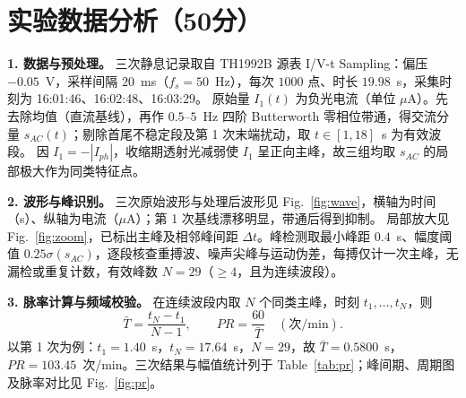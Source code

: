 \documentclass[12pt,a4paper]{ctexart}
\begin{document}
\section*{实验数据分析（50分）}

\noindent\textbf{1. 数据与预处理。}
三次静息记录取自 TH1992B 源表 I/V-t Sampling：偏压 $-0.05$~V，采样间隔 $20$~ms（$f_s=50$~Hz），每次 $1000$ 点、时长 $19.98$~s，采集时刻为 16:01:46、16:02:48、16:03:29。
原始量 $I_1(t)$ 为负光电流（单位 $\mu$A）。先去除均值（直流基线），再作 $0.5$--$5$~Hz 四阶 Butterworth 零相位带通，得交流分量 $s_{AC}(t)$；剔除首尾不稳定段及第 1 次末端扰动，取 $t\in[1,18]$~s 为有效波段。
因 $I_1=-|I_{ph}|$，收缩期透射光减弱使 $I_1$ 呈正向主峰，故三组均取 $s_{AC}$ 的局部极大作为同类特征点。

\noindent\textbf{2. 波形与峰识别。}
三次原始波形与处理后波形见 Fig.~\ref{fig:wave}，横轴为时间（s）、纵轴为电流（$\mu$A）；第 1 次基线漂移明显，带通后得到抑制。
局部放大见 Fig.~\ref{fig:zoom}，已标出主峰及相邻峰间距 $\Delta t$。峰检测取最小峰距 $0.4$~s、幅度阈值 $0.25\sigma(s_{AC})$，逐段核查重搏波、噪声尖峰与运动伪差，每搏仅计一次主峰，无漏检或重复计数，有效峰数 $N=29$（$\ge 4$，且为连续波段）。

\noindent\textbf{3. 脉率计算与频域校验。}
在连续波段内取 $N$ 个同类主峰，时刻 $t_1,\ldots,t_N$，则
\[
\bar T=\frac{t_N-t_1}{N-1},\qquad PR=\frac{60}{\bar T}\quad(\text{次/min}).
\]
以第 1 次为例：$t_1=1.40$~s，$t_N=17.64$~s，$N=29$，故 $\bar T=0.5800$~s，$PR=103.45$~次/min。三次结果与幅值统计列于 Table~\ref{tab:pr}；峰间期、周期图及脉率对比见 Fig.~\ref{fig:pr}。

\begin{table}[htbp]
\centering
\caption{三次静息 PPG 幅值统计与脉率（峰间距法）}
\label{tab:pr}
\small\setlength{\tabcolsep}{3pt}
\end{table}
\end{document}
